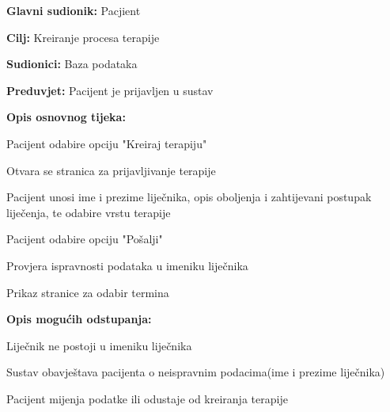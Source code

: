 				\noindent {}
				\begin{packed_item}
					
					\item \textbf{Glavni sudionik: }Pacjient
					\item  \textbf{Cilj: }Kreiranje procesa terapije
					\item  \textbf{Sudionici: }Baza podataka
					\item  \textbf{Preduvjet: }Pacijent je prijavljen u sustav
					\item  \textbf{Opis osnovnog tijeka: }
					
					\item[] \begin{packed_enum}
						
						\item Pacijent odabire opciju "Kreiraj terapiju"
						\item Otvara se stranica za prijavljivanje terapije
						\item Pacijent unosi ime i prezime liječnika, opis oboljenja i zahtijevani postupak liječenja, te odabire vrstu terapije
						\item Pacijent odabire opciju "Pošalji"
						\item Provjera ispravnosti podataka u imeniku liječnika
						\item Prikaz stranice za odabir termina
					\end{packed_enum}
					
					\item  \textbf{Opis mogućih odstupanja:}
					
					\item[] \begin{packed_item}
						
						\item[3.a] Liječnik ne postoji u imeniku liječnika
						\item[] \begin{packed_enum}
							
							\item Sustav obavještava pacijenta o neispravnim podacima(ime i prezime liječnika)
							\item Pacijent mijenja podatke ili odustaje od kreiranja terapije
							
						\end{packed_enum}
												
					\end{packed_item}
				\end{packed_item}
